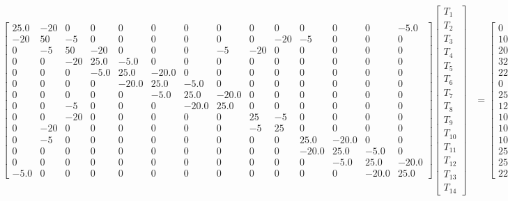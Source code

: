 \documentclass[10pt]{article}
\begin{document}
\begin{landscape}
{{\begin{align*}
\left[\begin{array}{cccccccccccccc}25.0 & -20 & 0 & 0 & 0 & 0 & 0 & 0 & 0 & 0 & 0 & 0 & 0 & -5.0\\-20 & 50 & -5 & 0 & 0 & 0 & 0 & 0 & 0 & -20 & -5 & 0 & 0 & 0\\0 & -5 & 50 & -20 & 0 & 0 & 0 & -5 & -20 & 0 & 0 & 0 & 0 & 0\\0 & 0 & -20 & 25.0 & -5.0 & 0 & 0 & 0 & 0 & 0 & 0 & 0 & 0 & 0\\0 & 0 & 0 & -5.0 & 25.0 & -20.0 & 0 & 0 & 0 & 0 & 0 & 0 & 0 & 0\\0 & 0 & 0 & 0 & -20.0 & 25.0 & -5.0 & 0 & 0 & 0 & 0 & 0 & 0 & 0\\0 & 0 & 0 & 0 & 0 & -5.0 & 25.0 & -20.0 & 0 & 0 & 0 & 0 & 0 & 0\\0 & 0 & -5 & 0 & 0 & 0 & -20.0 & 25.0 & 0 & 0 & 0 & 0 & 0 & 0\\0 & 0 & -20 & 0 & 0 & 0 & 0 & 0 & 25 & -5 & 0 & 0 & 0 & 0\\0 & -20 & 0 & 0 & 0 & 0 & 0 & 0 & -5 & 25 & 0 & 0 & 0 & 0\\0 & -5 & 0 & 0 & 0 & 0 & 0 & 0 & 0 & 0 & 25.0 & -20.0 & 0 & 0\\0 & 0 & 0 & 0 & 0 & 0 & 0 & 0 & 0 & 0 & -20.0 & 25.0 & -5.0 & 0\\0 & 0 & 0 & 0 & 0 & 0 & 0 & 0 & 0 & 0 & 0 & -5.0 & 25.0 & -20.0\\-5.0 & 0 & 0 & 0 & 0 & 0 & 0 & 0 & 0 & 0 & 0 & 0 & -20.0 & 25.0\end{array}\right] \left[\begin{matrix}T_{1}\\T_{2}\\T_{3}\\T_{4}\\T_{5}\\T_{6}\\T_{7}\\T_{8}\\T_{9}\\T_{10}\\T_{11}\\T_{12}\\T_{13}\\T_{14}\end{matrix}\right] &= \left[\begin{matrix}0\\100.0\\200.0\\325.0\\225.0\\0\\25.0\\125.0\\100.0\\100.0\\100.0\\25.0\\250.0\\225.0\end{matrix}\right]
\end{align*}
}}


\end{landscape}
\end{document}
